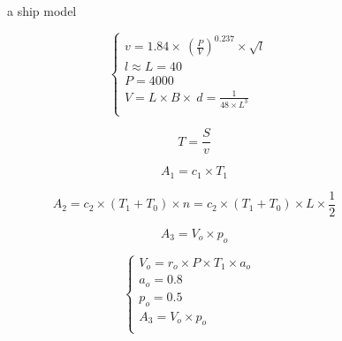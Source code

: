 \documentclass{mcmthesis}
\begin{document}
\begin{figure}[tbp]
  \caption{a ship model}\label{figure1}
\end{figure}

\begin{equation}
\left\{
\begin{array}{lr}
v=1.84\times \ (\frac{P}{V}) ^{0.237} \times \sqrt{l} &\\
l \approx L= 40 &\\
P=4000&\\
V=L\times B\times\ d =\frac{1}{48\times L^3}\\
\end{array}
\right.
\end{equation}

\begin{equation}\label{5}
T=\frac{S}{v}
\end{equation}


\begin{equation}\label{5}
A_1=c_1 \times T_1
\end{equation}

\begin{equation}\label{6}
A_2=c_2  \times( T_1+T_0)  \times n =c_2  \times( T_1+T_0) \times L \times  \frac{1}{2}
\end{equation}

\begin{equation}\label{7}
A_3=V_o  \times p_o
\end{equation}

\begin{equation}
\left\{
\begin{array}{lr}
V_o=r_o \times P \times T_1 \times a_o &\\
a_o=0.8&\\
p_o=0.5&\\
A_3=V_o  \times p_o\\
\end{array}
\right.
\end{equation}
\end{document}
